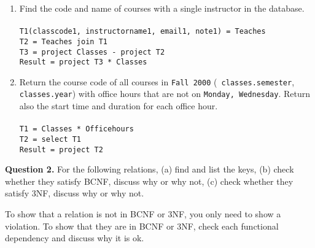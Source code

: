 \documentclass[11pt]{article}
\begin{document}
\begin{enumerate} [label=\Alph*]
\item Find the code and name of courses with a single instructor in
  the database. \\\\
\texttt{T1(classcode1, instructorname1, email1, note1) = Teaches} \\
\texttt{T2 = Teaches join T1} \\
\texttt{T3 = project Classes  - project T2} \\
\texttt{Result = project T3 * Classes } \\

\item Return the course code of all courses in {\tt Fall 2000} ({\tt
  classes.semester}, {\tt classes.year}) with office hours that are
  not on {\tt Monday, Wednesday}. Return also the start time and duration
  for each office hour. \\\\
\texttt{T1 = Classes * Officehours} \\
\texttt{T2 = select T1} \\
\texttt{Result = project T2} \\
\end{enumerate}

{\bf Question 2.} For the following relations, (a) find and list the
keys, (b) check whether they satisfy BCNF, discuss why or why not, (c)
check whether they satisfy 3NF, discuss why or why not.

To show that a relation is not in BCNF or 3NF, you only need to show a
violation. To show that they are in BCNF or 3NF, check each functional
dependency and discuss why it is ok.
\end{document}
